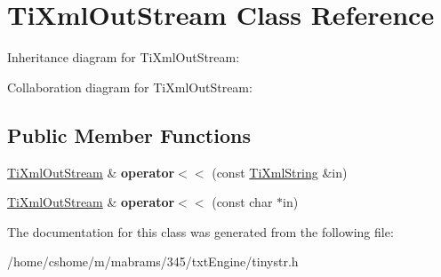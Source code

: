 \hypertarget{class_ti_xml_out_stream}{
\section{\-Ti\-Xml\-Out\-Stream \-Class \-Reference}
\label{class_ti_xml_out_stream}
}


\-Inheritance diagram for \-Ti\-Xml\-Out\-Stream\-:


\-Collaboration diagram for \-Ti\-Xml\-Out\-Stream\-:
\subsection*{\-Public \-Member \-Functions}
\begin{DoxyCompactItemize}
\item 
\hypertarget{class_ti_xml_out_stream_a3640dcb1c0903be3bc6966cdc9a79db6}{
\hyperlink{class_ti_xml_out_stream}{\-Ti\-Xml\-Out\-Stream} \& {\bfseries operator$<$$<$} (const \hyperlink{class_ti_xml_string}{\-Ti\-Xml\-String} \&in)}
\label{class_ti_xml_out_stream_a3640dcb1c0903be3bc6966cdc9a79db6}

\item 
\hypertarget{class_ti_xml_out_stream_af2117e5a8cbfcb69544804ad2859bfb6}{
\hyperlink{class_ti_xml_out_stream}{\-Ti\-Xml\-Out\-Stream} \& {\bfseries operator$<$$<$} (const char $\ast$in)}
\label{class_ti_xml_out_stream_af2117e5a8cbfcb69544804ad2859bfb6}

\end{DoxyCompactItemize}


\-The documentation for this class was generated from the following file\-:\begin{DoxyCompactItemize}
\item 
/home/cshome/m/mabrams/345/txt\-Engine/tinystr.\-h\end{DoxyCompactItemize}
